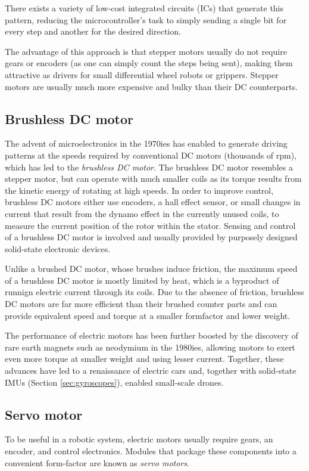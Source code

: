 There exists a variety of low-cost integrated circuits (ICs) that generate this pattern, reducing the microcontroller's task to simply sending a single bit for every step and another for the desired direction. 

The advantage of this approach is that stepper motors usually do not require gears or encoders (as one can simply count the steps being sent), making them attractive as drivers for small differential wheel robots or grippers. Stepper motors are usually much more expensive and bulky than their DC counterparts.

\subsection{Brushless DC motor}\label{sec:brushlessDC}
The advent of microelectronics in the 1970ies has enabled to generate driving patterns at the speeds required by conventional DC motors (thousands of rpm), which has led to the \emph{brushless DC motor}. The brushless DC motor resembles a stepper motor, but can operate with much smaller coils as its torque results from the kinetic energy of rotating at high speeds. In order to improve control, brushless DC motors either use encoders, a hall effect sensor, or small changes in current that result from the dynamo effect in the currently unused coils, to measure the current position of the rotor within the stator. Sensing and control of a brushless DC motor is involved and usually provided by purposely designed solid-state electronic devices. 

Unlike a brushed DC motor, whose brushes induce friction, the maximum speed of a brushless DC motor is mostly limited by heat, which is a byproduct of runnign electric current through its coils. Due to the absence of friction, brushless DC motors are far more efficient than their brushed counter parts and can provide equivalent speed and torque at a smaller formfactor and lower weight. 

The performance of electric motors has been further boosted by the discovery of rare earth magnets such as neodymium in the 1980ies, allowing motors to exert even more torque at smaller weight and using lesser current. Together, these advances have led to a renaissance of electric cars and, together with solid-state IMUs (Section \ref{sec:gyroscopes}), enabled small-scale drones.

\subsection{Servo motor}
To be useful in a robotic system, electric motors usually require gears, an encoder, and control electronics. Modules that package these components into a convenient form-factor are known as \emph{servo motors}. 

